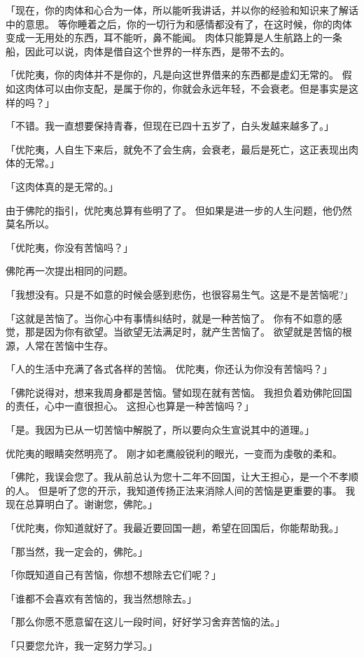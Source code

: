 \documentclass[twoside,openany]{book}
\begin{document}
「现在，你的肉体和心合为一体，所以能听我讲话，并以你的经验和知识来了解话中的意思。
等你睡着之后，你的一切行为和感情都没有了，在这时候，你的肉体变成一无用处的东西，耳不能听，鼻不能闻。
肉体只能算是人生航路上的一条船，因此可以说，肉体是借自这个世界的一样东西，是带不去的。

「优陀夷，你的肉体并不是你的，凡是向这世界借来的东西都是虚幻无常的。
假如这肉体可以由你支配，是属于你的，你就会永远年轻，不会衰老。但是事实是这样的吗？」

「不错。我一直想要保持青春，但现在已四十五岁了，白头发越来越多了。」

「优陀夷，人自生下来后，就免不了会生病，会衰老，最后是死亡，这正表现出肉体的无常。」

「这肉体真的是无常的。」

由于佛陀的指引，优陀夷总算有些明了了。
但如果是进一步的人生问题，他仍然莫名所以。

「优陀夷，你没有苦恼吗？」

佛陀再一次提出相同的问题。

「我想没有。只是不如意的时候会感到悲伤，也很容易生气。这是不是苦恼呢?」

「这就是苦恼了。当你心中有事情纠结时，就是一种苦恼了。
你有不如意的感觉，那是因为你有欲望。当欲望无法满足时，就产生苦恼了。
欲望就是苦恼的根源，人常在苦恼中生存。

「人的生活中充满了各式各样的苦恼。
优陀夷，你还认为你没有苦恼吗？」

「佛陀说得对，想来我周身都是苦恼。譬如现在就有苦恼。
我担负着劝佛陀回国的责任，心中一直很担心。
这担心也算是一种苦恼吗？」

「是。我因为已从一切苦恼中解脱了，所以要向众生宣说其中的道理。」

优陀夷的眼睛突然明亮了。
刚才如老鹰般锐利的眼光，一变而为虔敬的柔和。

「佛陀，我误会您了。我从前总认为您十二年不回国，让大王担心，是一个不孝顺的人。
但是听了您的开示，我知道传扬正法来消除人间的苦恼是更重要的事。
我现在总算明白了。谢谢您，佛陀。」

「优陀夷，你知道就好了。我最近要回国一趟，希望在回国后，你能帮助我。」

「那当然，我一定会的，佛陀。」

「你既知道自己有苦恼，你想不想除去它们呢？」

「谁都不会喜欢有苦恼的，我当然想除去。」

「那么你愿不愿意留在这儿一段时间，好好学习舍弃苦恼的法。」

「只要您允许，我一定努力学习。」
\end{document}
